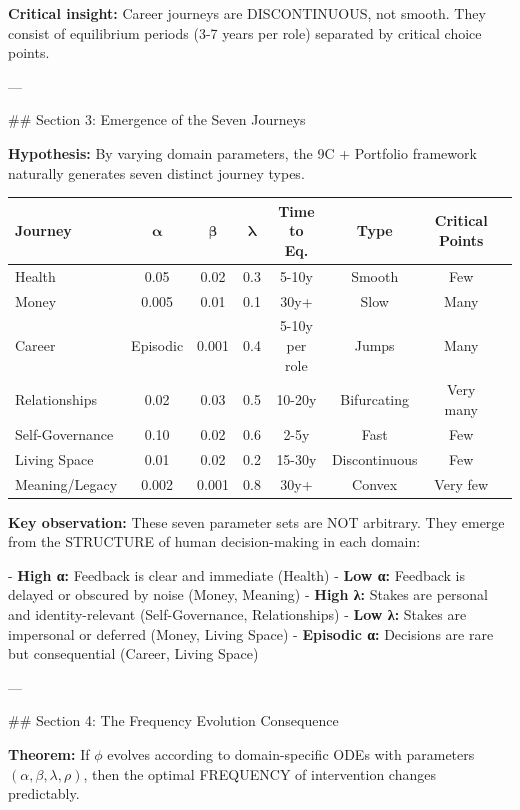\textbf{Critical insight:} Career journeys are DISCONTINUOUS, not smooth. They consist of equilibrium periods (3-7 years per role) separated by critical choice points.

---

## Section 3: Emergence of the Seven Journeys

\textbf{Hypothesis:} By varying domain parameters, the 9C + Portfolio framework naturally generates seven distinct journey types.

\begin{center}
\begin{tabular}{@{}p{2cm}ccccccc@{}}
\toprule
\textbf{Journey} & $\boldsymbol{\alpha}$ & $\boldsymbol{\beta}$ & $\boldsymbol{\lambda}$ & \textbf{Time to Eq.} & \textbf{Type} & \textbf{Critical Points} \\
\midrule
Health & 0.05 & 0.02 & 0.3 & 5-10y & Smooth & Few \\
Money & 0.005 & 0.01 & 0.1 & 30y+ & Slow & Many \\
Career & Episodic & 0.001 & 0.4 & 5-10y per role & Jumps & Many \\
Relationships & 0.02 & 0.03 & 0.5 & 10-20y & Bifurcating & Very many \\
Self-Governance & 0.10 & 0.02 & 0.6 & 2-5y & Fast & Few \\
Living Space & 0.01 & 0.02 & 0.2 & 15-30y & Discontinuous & Few \\
Meaning/Legacy & 0.002 & 0.001 & 0.8 & 30y+ & Convex & Very few \\
\midrule
\end{tabular}
\end{center}

\textbf{Key observation:} These seven parameter sets are NOT arbitrary. They emerge from the STRUCTURE of human decision-making in each domain:

- \textbf{High α:} Feedback is clear and immediate (Health)
- \textbf{Low α:} Feedback is delayed or obscured by noise (Money, Meaning)
- \textbf{High λ:} Stakes are personal and identity-relevant (Self-Governance, Relationships)
- \textbf{Low λ:} Stakes are impersonal or deferred (Money, Living Space)
- \textbf{Episodic α:} Decisions are rare but consequential (Career, Living Space)

---

## Section 4: The Frequency Evolution Consequence

\textbf{Theorem:} If $\phi$ evolves according to domain-specific ODEs with parameters $(\alpha, \beta, \lambda, \rho)$, then the optimal FREQUENCY of intervention changes predictably.

